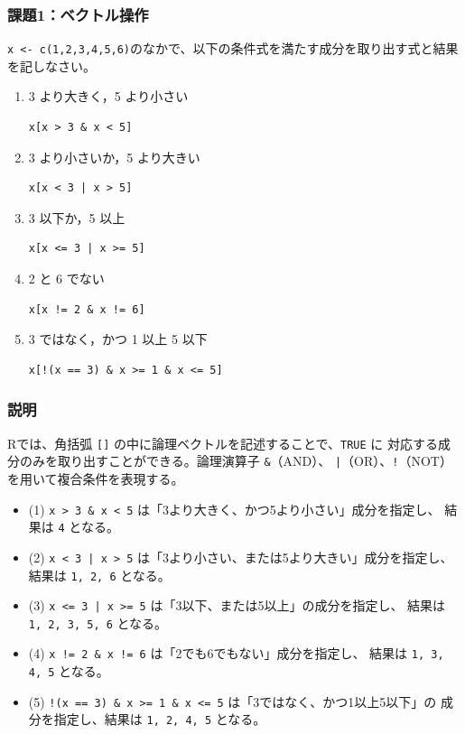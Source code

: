 \documentclass[12pt,a4paper]{ltjsarticle}
\begin{document}
\subsubsection{課題1：ベクトル操作}\label{sec:vector-task1}
\texttt{x <- c(1,2,3,4,5,6)}のなかで、以下の条件式を満たす成分を取り出す式と結果を記しなさい。
\begin{enumerate}[nosep, label=(\arabic*)]
    \item 3 より大きく，5 より小さい
\begin{lstlisting}
x[x > 3 & x < 5]
\end{lstlisting}
    
    \item 3 より小さいか，5 より大きい
\begin{lstlisting}
x[x < 3 | x > 5]
\end{lstlisting}

    \item 3 以下か，5 以上
\begin{lstlisting}
x[x <= 3 | x >= 5]
\end{lstlisting}

    \item 2 と 6 でない
\begin{lstlisting}
x[x != 2 & x != 6]
\end{lstlisting}

    \item 3 ではなく，かつ 1 以上 5 以下
\begin{lstlisting}
x[!(x == 3) & x >= 1 & x <= 5]
\end{lstlisting}
\end{enumerate}

\subsubsection*{説明}
Rでは、角括弧 \texttt{[]} の中に論理ベクトルを記述することで、\texttt{TRUE} に
対応する成分のみを取り出すことができる。論理演算子 \texttt{\&}（AND）、
\texttt{|}（OR）、\texttt{!}（NOT）を用いて複合条件を表現する。

\begin{itemize}[nosep]
    \item (1) \texttt{x > 3 \& x < 5} は「3より大きく、かつ5より小さい」成分を指定し、
          結果は \texttt{4} となる。
    \item (2) \texttt{x < 3 | x > 5} は「3より小さい、または5より大きい」成分を指定し、
          結果は \texttt{1, 2, 6} となる。
    \item (3) \texttt{x <= 3 | x >= 5} は「3以下、または5以上」の成分を指定し、
          結果は \texttt{1, 2, 3, 5, 6} となる。
    \item (4) \texttt{x != 2 \& x != 6} は「2でも6でもない」成分を指定し、
          結果は \texttt{1, 3, 4, 5} となる。
    \item (5) \texttt{!(x == 3) \& x >= 1 \& x <= 5} は「3ではなく、かつ1以上5以下」の
          成分を指定し、結果は \texttt{1, 2, 4, 5} となる。
\end{itemize}
\end{document}
